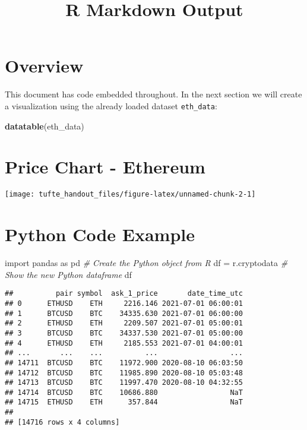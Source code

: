 \documentclass[]{tufte-handout}
\title{R Markdown Output}
\date{}
\newenvironment{Shaded}{}{}
\newcommand{\CommentTok}[1]{\textcolor[rgb]{0.38,0.63,0.69}{\textit{#1}}}
\newcommand{\ImportTok}[1]{#1}
\newcommand{\KeywordTok}[1]{\textcolor[rgb]{0.00,0.44,0.13}{\textbf{#1}}}
\newcommand{\NormalTok}[1]{#1}
\newcommand{\OperatorTok}[1]{\textcolor[rgb]{0.40,0.40,0.40}{#1}}
\begin{document}
\maketitle




\hypertarget{overview}{%
\section{Overview}\label{overview}}

This document has code embedded throughout. In the next section we will
create a visualization using the already loaded dataset
\texttt{eth\_data}:

\begin{Shaded}
\begin{Highlighting}[]
\KeywordTok{datatable}\NormalTok{(eth_data)}
\end{Highlighting}
\end{Shaded}

\hypertarget{htmlwidget-21f582ce2fb4d8479759}{}

\hypertarget{price-chart---ethereum}{%
\section{Price Chart - Ethereum}\label{price-chart---ethereum}}

\texttt{[image: tufte\_handout\_files/figure-latex/unnamed-chunk-2-1]}

\hypertarget{python-code-example}{%
\section{Python Code Example}\label{python-code-example}}

\begin{Shaded}
\begin{Highlighting}[]
\ImportTok{import}\NormalTok{ pandas }\ImportTok{as}\NormalTok{ pd}
\CommentTok{# Create the Python object from R}
\NormalTok{df }\OperatorTok{=}\NormalTok{ r.cryptodata}
\CommentTok{# Show the new Python dataframe}
\NormalTok{df}
\end{Highlighting}
\end{Shaded}

\begin{verbatim}
##          pair symbol  ask_1_price       date_time_utc
## 0      ETHUSD    ETH     2216.146 2021-07-01 06:00:01
## 1      BTCUSD    BTC    34335.630 2021-07-01 06:00:00
## 2      ETHUSD    ETH     2209.507 2021-07-01 05:00:01
## 3      BTCUSD    BTC    34337.530 2021-07-01 05:00:00
## 4      ETHUSD    ETH     2185.553 2021-07-01 04:00:01
## ...       ...    ...          ...                 ...
## 14711  BTCUSD    BTC    11972.900 2020-08-10 06:03:50
## 14712  BTCUSD    BTC    11985.890 2020-08-10 05:03:48
## 14713  BTCUSD    BTC    11997.470 2020-08-10 04:32:55
## 14714  BTCUSD    BTC    10686.880                 NaT
## 14715  ETHUSD    ETH      357.844                 NaT
## 
## [14716 rows x 4 columns]
\end{verbatim}
\end{document}
